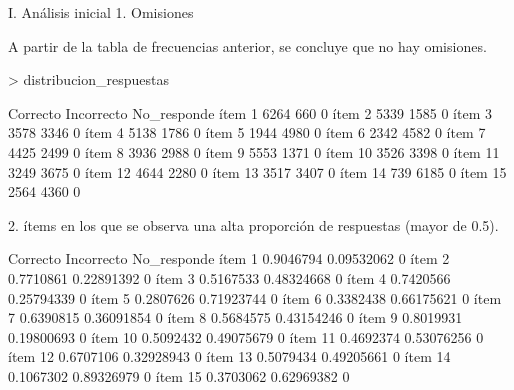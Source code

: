 \documentclass{article}
\begin{document}

I. Análisis inicial
1. Omisiones

A partir de la tabla de frecuencias anterior, se concluye que no hay omisiones. 
\begin{Schunk}
\begin{Sinput}
> distribucion_respuestas
\end{Sinput}
\begin{Soutput}
        Correcto Incorrecto No_responde
ítem 1      6264        660           0
ítem 2      5339       1585           0
ítem 3      3578       3346           0
ítem 4      5138       1786           0
ítem 5      1944       4980           0
ítem 6      2342       4582           0
ítem 7      4425       2499           0
ítem 8      3936       2988           0
ítem 9      5553       1371           0
ítem 10     3526       3398           0
ítem 11     3249       3675           0
ítem 12     4644       2280           0
ítem 13     3517       3407           0
ítem 14      739       6185           0
ítem 15     2564       4360           0
\end{Soutput}
\end{Schunk}
2.	ítems en los que se observa una alta proporción de respuestas (mayor de 0.5). 
\begin{Schunk}
\begin{Soutput}
         Correcto Incorrecto No_responde
ítem 1  0.9046794 0.09532062           0
ítem 2  0.7710861 0.22891392           0
ítem 3  0.5167533 0.48324668           0
ítem 4  0.7420566 0.25794339           0
ítem 5  0.2807626 0.71923744           0
ítem 6  0.3382438 0.66175621           0
ítem 7  0.6390815 0.36091854           0
ítem 8  0.5684575 0.43154246           0
ítem 9  0.8019931 0.19800693           0
ítem 10 0.5092432 0.49075679           0
ítem 11 0.4692374 0.53076256           0
ítem 12 0.6707106 0.32928943           0
ítem 13 0.5079434 0.49205661           0
ítem 14 0.1067302 0.89326979           0
ítem 15 0.3703062 0.62969382           0
\end{Soutput}
\end{Schunk}
\end{document}

